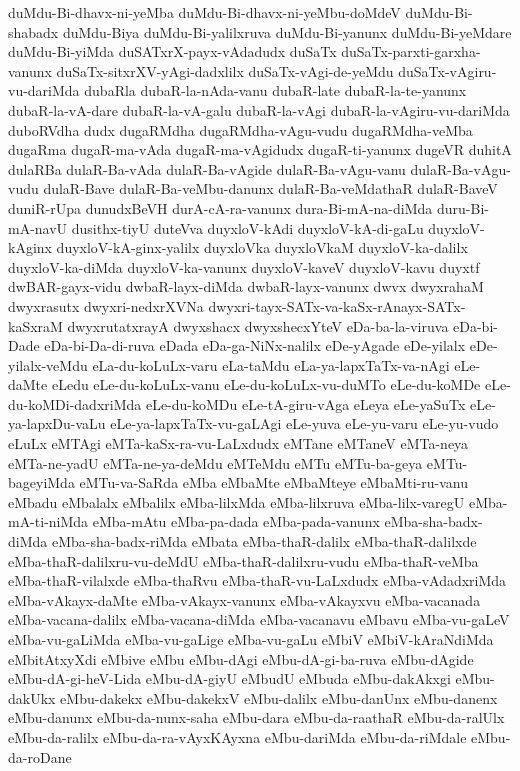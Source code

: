 {duMdu-Bi-dhavx-ni-yeMba
duMdu-Bi-dhavx-ni-yeMbu-doMdeV
duMdu-Bi-shabadx
duMdu-Biya
duMdu-Bi-yalilxruva
duMdu-Bi-yanunx
duMdu-Bi-yeMdare
duMdu-Bi-yiMda
duSATxrX-payx-vAdadudx
duSaTx
duSaTx-parxti-garxha-vanunx
duSaTx-sitxrXV-yAgi-dadxlilx
duSaTx-vAgi-de-yeMdu
duSaTx-vAgiru-vu-dariMda
dubaRla
dubaR-la-nAda-vanu
dubaR-late
dubaR-la-te-yanunx
dubaR-la-vA-dare
dubaR-la-vA-galu
dubaR-la-vAgi
dubaR-la-vAgiru-vu-dariMda
duboRVdha
dudx
dugaRMdha
dugaRMdha-vAgu-vudu
dugaRMdha-veMba
dugaRma
dugaR-ma-vAda
dugaR-ma-vAgidudx
dugaR-ti-yanunx
dugeVR
duhitA
dulaRBa
dulaR-Ba-vAda
dulaR-Ba-vAgide
dulaR-Ba-vAgu-vanu
dulaR-Ba-vAgu-vudu
dulaR-Bave
dulaR-Ba-veMbu-danunx
dulaR-Ba-veMdathaR
dulaR-BaveV
duniR-rUpa
dunudxBeVH
durA-cA-ra-vanunx
dura-Bi-mA-na-diMda
duru-Bi-mA-navU
dusithx-tiyU
duteVva
duyxloV-kAdi
duyxloV-kA-di-gaLu
duyxloV-kAginx
duyxloV-kA-ginx-yalilx
duyxloVka
duyxloVkaM
duyxloV-ka-dalilx
duyxloV-ka-diMda
duyxloV-ka-vanunx
duyxloV-kaveV
duyxloV-kavu
duyxtf
dwBAR-gayx-vidu
dwbaR-layx-diMda
dwbaR-layx-vanunx
dwvx
dwyxrahaM
dwyxrasutx
dwyxri-nedxrXVNa
dwyxri-tayx-SATx-va-kaSx-rAnayx-SATx-kaSxraM
dwyxrutatxrayA
dwyxshacx
dwyxshecxYteV
eDa-ba-la-viruva
eDa-bi-Dade
eDa-bi-Da-di-ruva
eDada
eDa-ga-NiNx-nalilx
eDe-yAgade
eDe-yilalx
eDe-yilalx-veMdu
eLa-du-koLuLx-varu
eLa-taMdu
eLa-ya-lapxTaTx-va-nAgi
eLe-daMte
eLedu
eLe-du-koLuLx-vanu
eLe-du-koLuLx-vu-duMTo
eLe-du-koMDe
eLe-du-koMDi-dadxriMda
eLe-du-koMDu
eLe-tA-giru-vAga
eLeya
eLe-yaSuTx
eLe-ya-lapxDu-vaLu
eLe-ya-lapxTaTx-vu-gaLAgi
eLe-yuva
eLe-yu-varu
eLe-yu-vudo
eLuLx
eMTAgi
eMTa-kaSx-ra-vu-LaLxdudx
eMTane
eMTaneV
eMTa-neya
eMTa-ne-yadU
eMTa-ne-ya-deMdu
eMTeMdu
eMTu
eMTu-ba-geya
eMTu-bageyiMda
eMTu-va-SaRda
eMba
eMbaMte
eMbaMteye
eMbaMti-ru-vanu
eMbadu
eMbalalx
eMbalilx
eMba-lilxMda
eMba-lilxruva
eMba-lilx-varegU
eMba-mA-ti-niMda
eMba-mAtu
eMba-pa-dada
eMba-pada-vanunx
eMba-sha-badx-diMda
eMba-sha-badx-riMda
eMbata
eMba-thaR-dalilx
eMba-thaR-dalilxde
eMba-thaR-dalilxru-vu-deMdU
eMba-thaR-dalilxru-vudu
eMba-thaR-veMba
eMba-thaR-vilalxde
eMba-thaRvu
eMba-thaR-vu-LaLxdudx
eMba-vAdadxriMda
eMba-vAkayx-daMte
eMba-vAkayx-vanunx
eMba-vAkayxvu
eMba-vacanada
eMba-vacana-dalilx
eMba-vacana-diMda
eMba-vacanavu
eMbavu
eMba-vu-gaLeV
eMba-vu-gaLiMda
eMba-vu-gaLige
eMba-vu-gaLu
eMbiV
eMbiV-kAraNdiMda
eMbitAtxyXdi
eMbive
eMbu
eMbu-dAgi
eMbu-dA-gi-ba-ruva
eMbu-dAgide
eMbu-dA-gi-heV-Lida
eMbu-dA-giyU
eMbudU
eMbuda
eMbu-dakAkxgi
eMbu-dakUkx
eMbu-dakekx
eMbu-dakekxV
eMbu-dalilx
eMbu-danUnx
eMbu-danenx
eMbu-danunx
eMbu-da-nunx-saha
eMbu-dara
eMbu-da-raathaR
eMbu-da-ralUlx
eMbu-da-ralilx
eMbu-da-ra-vAyxKAyxna
eMbu-dariMda
eMbu-da-riMdale
eMbu-da-roDane
}
